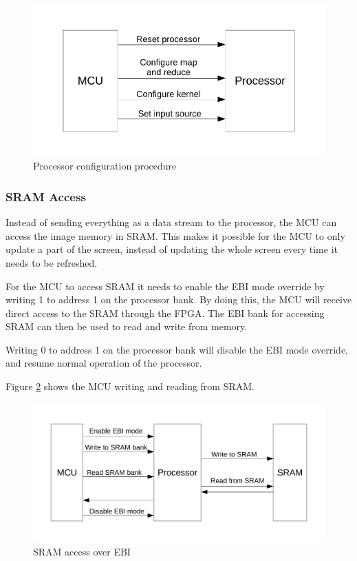 \begin{figure}[h!]
    \includegraphics[width=\linewidth]{img/processor_configuration.pdf}
    \caption{Processor configuration procedure}
    \label{fig:processorConfiguration}
\end{figure}

\subsubsection{SRAM Access}
Instead of sending everything as a data stream to the processor, the MCU can access the image memory in SRAM. This makes it possible for the MCU to only update a part of the screen, instead of updating the whole screen every time it needs to be refreshed.

For the MCU to access SRAM it needs to enable the EBI mode override by writing 1 to address 1 on the processor bank. By doing this, the MCU will receive direct access to the SRAM through the FPGA.
The EBI bank for accessing SRAM can then be used to read and write from memory.

Writing 0 to address 1 on the processor bank will disable the EBI mode override, and resume normal operation of the processor.

Figure \ref{fig:sramAccess} shows the MCU writing and reading from SRAM.

\begin{figure}[h!]
    \includegraphics[width=\linewidth]{img/sram_access.pdf}
    \caption{SRAM access over EBI}
    \label{fig:sramAccess}
\end{figure}

